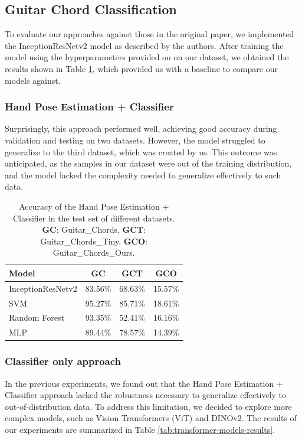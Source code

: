 \documentclass[10pt,twocolumn,letterpaper]{article}
\begin{document}
\subsection{Guitar Chord Classification}
To evaluate our approaches against those in the original paper, we implemented the InceptionResNetv2 model as described by the authors. After training the model using the hyperparameters provided on \cite{Kristian_Zaman_Tenoyo_Jodhinata_2024} on our dataset, we obtained the results shown in Table \ref{tab:handpose-classifier-results}, which provided us with a baseline to compare our models against.

\subsubsection{Hand Pose Estimation + Classifier}
Surprisingly, this approach performed well, achieving good accuracy during validation and testing on two datasets. However, the model struggled to generalize to the third dataset, which was created by us. This outcome was anticipated, as the samples in our dataset were out of the training distribution, and the model lacked the complexity needed to generalize effectively to such data.



\begin{table}[h]
  \centering
  \begin{tabular}{lccc}
    \toprule
    \textbf{Model} & \textbf{GC} & \textbf{GCT} & \textbf{GCO} \\
    \midrule
 InceptionResNetv2 & 83.56\% & 68.63\% & 15.57\% \\
    \midrule
 SVM & 95.27\% & 85.71\% & 18.61\% \\
 Random Forest & 93.35\% & 52.41\% & 16.16\%  \\
 MLP & 89.44\% & 78.57\% & 14.39\% \\
    \bottomrule
  \end{tabular}
  \caption{Accuracy of the Hand Pose Estimation + Classifier in the test set of different datasets. \textbf{GC}: Guitar\_Chords, \textbf{GCT}: Guitar\_Chords\_Tiny, \textbf{GCO}: Guitar\_Chords\_Ours.}
  \label{tab:handpose-classifier-results}
\end{table}

\subsubsection{Classifier only approach}
In the previous experiments, we found out that the Hand Pose Estimation + Classifier approach lacked the robustness necessary to generalize effectively to out-of-distribution data. To address this limitation, we decided to explore more complex models, such as Vision Transformers (ViT) and DINOv2. The results of our experiments are summarized in Table \ref{tab:transformer-models-results}.
\end{document}
